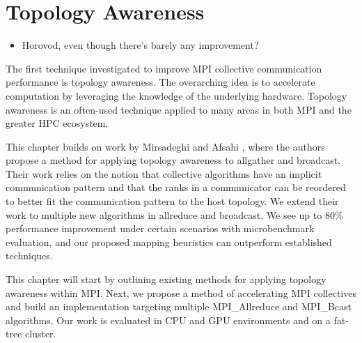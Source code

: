 
\glsresetall %
\chapter[Topology]{Topology Awareness}\label{ch:TopologyAwareness}


\begin{itemize}
    \item Horovod, even though there's barely any improvement?
\end{itemize}

The first technique investigated to improve MPI collective communication performance is topology awareness.
The overarching idea is to accelerate computation by leveraging the knowledge of the underlying hardware.
Topology awareness is an often-used technique applied to many areas in both MPI and the greater HPC ecosystem.

This chapter builds on work by Mirsadeghi and Afsahi \cite{Mirsadeghi2016TopoAwareCollRR}, where the authors propose a method for applying topology awareness to allgather and broadcast.
Their work relies on the notion that collective algorithms have an implicit communication pattern and that the ranks in a communicator can be reordered to better fit the communication pattern to the host topology.
We extend their work to multiple new algorithms in allreduce and broadcast.
We see up to 80\% performance improvement under certain scenarios with microbenchmark evaluation, and our proposed mapping heuristics can outperform established techniques.

This chapter will start by outlining existing methods for applying topology awareness within MPI.
Next, we propose a method of accelerating MPI collectives and build an implementation targeting multiple MPI\_Allreduce and MPI\_Bcast algorithms.
Our work is evaluated in CPU and GPU environments and on a fat-tree cluster.

